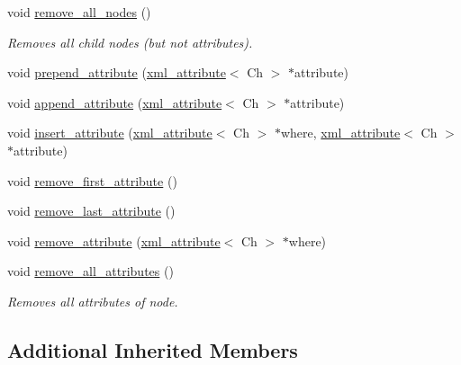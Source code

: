 \begin{DoxyCompactItemize}
\mbox{\label{classrapidxml_1_1xml__node_a95735358b079ae0adcfbbac69aa1fbc3}} 
void \hyperlink{classrapidxml_1_1xml__node_a95735358b079ae0adcfbbac69aa1fbc3}{remove\+\_\+all\+\_\+nodes} ()
\begin{DoxyCompactList}\small\item\em Removes all child nodes (but not attributes). \end{DoxyCompactList}\item 
void \hyperlink{classrapidxml_1_1xml__node_a8b62ee76489faf8e2d1210869d547684}{prepend\+\_\+attribute} (\hyperlink{classrapidxml_1_1xml__attribute}{xml\+\_\+attribute}$<$ Ch $>$ $\ast$attribute)
\item 
void \hyperlink{classrapidxml_1_1xml__node_a33ce3386f8c42dd4db658b75cbb6e6c4}{append\+\_\+attribute} (\hyperlink{classrapidxml_1_1xml__attribute}{xml\+\_\+attribute}$<$ Ch $>$ $\ast$attribute)
\item 
void \hyperlink{classrapidxml_1_1xml__node_a9fe659cdf4a5b3bbf5e8ffc98db5a84f}{insert\+\_\+attribute} (\hyperlink{classrapidxml_1_1xml__attribute}{xml\+\_\+attribute}$<$ Ch $>$ $\ast$where, \hyperlink{classrapidxml_1_1xml__attribute}{xml\+\_\+attribute}$<$ Ch $>$ $\ast$attribute)
\item 
void \hyperlink{classrapidxml_1_1xml__node_aa95192d2a165cca16c551ed2a2a06aec}{remove\+\_\+first\+\_\+attribute} ()
\item 
void \hyperlink{classrapidxml_1_1xml__node_a1781a2cbedc9a51d609ad5b528125635}{remove\+\_\+last\+\_\+attribute} ()
\item 
void \hyperlink{classrapidxml_1_1xml__node_a6f97b1b4f46a94a4587915df3c0c6b57}{remove\+\_\+attribute} (\hyperlink{classrapidxml_1_1xml__attribute}{xml\+\_\+attribute}$<$ Ch $>$ $\ast$where)
\item 
\mbox{\label{classrapidxml_1_1xml__node_aa8d5d9484aa1eb5ff1841a073c84c1aa}} 
void \hyperlink{classrapidxml_1_1xml__node_aa8d5d9484aa1eb5ff1841a073c84c1aa}{remove\+\_\+all\+\_\+attributes} ()
\begin{DoxyCompactList}\small\item\em Removes all attributes of node. \end{DoxyCompactList}\end{DoxyCompactItemize}
\subsection*{Additional Inherited Members}


